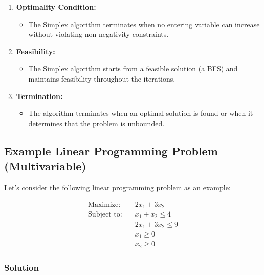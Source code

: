 \documentclass[a4paper]{article}
\begin{document}
\begin{enumerate}
    \item \textbf{Optimality Condition:}
    \begin{itemize}
        \item The Simplex algorithm terminates when no entering variable can increase without violating non-negativity constraints.
    \end{itemize}
    
    \item \textbf{Feasibility:}
    \begin{itemize}
        \item The Simplex algorithm starts from a feasible solution (a BFS) and maintains feasibility throughout the iterations.
    \end{itemize}
    
    \item \textbf{Termination:}
    \begin{itemize}
        \item The algorithm terminates when an optimal solution is found or when it determines that the problem is unbounded.
    \end{itemize}
\end{enumerate}

\subsection{Example Linear Programming Problem (Multivariable)}

Let's consider the following linear programming problem as an example:

\begin{align*}
\text{Maximize:} \quad & 2x_1 + 3x_2 \\
\text{Subject to:} \quad & x_1 + x_2 \leq 4 \\
& 2x_1 + 3x_2 \leq 9 \\
& x_1 \geq 0 \\
& x_2 \geq 0
\end{align*}

\subsubsection{Solution}
\end{document}
